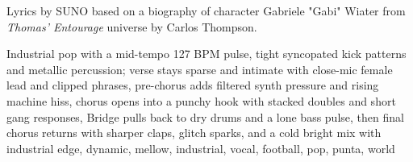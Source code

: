 
\begin{notes}
Lyrics by SUNO based on a biography of character Gabriele "Gabi" Wiater from \emph{Thomas’ Entourage} universe by Carlos Thompson.
\end{notes}
\begin{style}
Industrial pop with a mid-tempo 127 BPM pulse, tight syncopated kick patterns and metallic percussion; verse stays sparse and intimate with close-mic female lead and clipped phrases, pre-chorus adds filtered synth pressure and rising machine hiss, chorus opens into a punchy hook with stacked doubles and short gang responses, Bridge pulls back to dry drums and a lone bass pulse, then final chorus returns with sharper claps, glitch sparks, and a cold bright mix with industrial edge, dynamic, mellow, industrial, vocal, football, pop, punta, world
\end{style}
